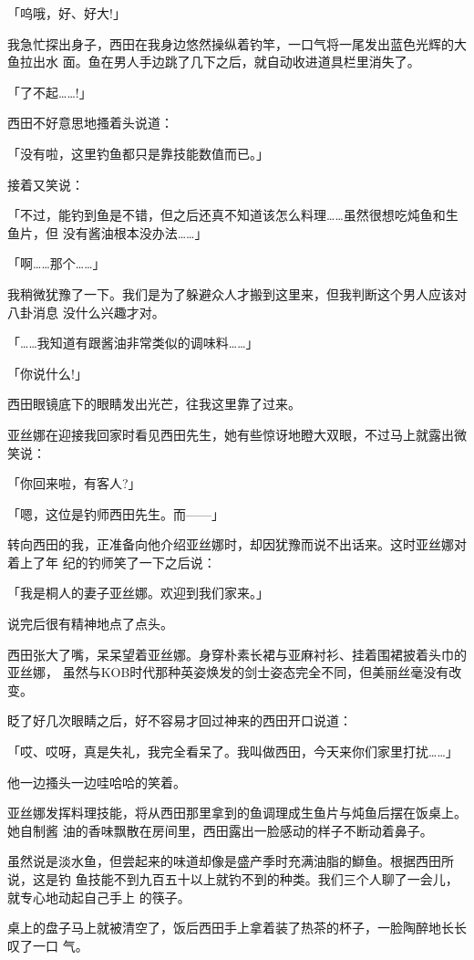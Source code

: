 \documentclass[11pt]{book}
\begin{document}
「呜哦，好、好大!」

我急忙探出身子，西田在我身边悠然操纵着钓竿，一口气将一尾发出蓝色光辉的大鱼拉出水
面。鱼在男人手边跳了几下之后，就自动收进道具栏里消失了。

「了不起……!」

西田不好意思地搔着头说道：

「没有啦，这里钓鱼都只是靠技能数值而已。」

接着又笑说：

「不过，能钓到鱼是不错，但之后还真不知道该怎么料理……虽然很想吃炖鱼和生鱼片，但
没有酱油根本没办法……」

「啊……那个……」

我稍微犹豫了一下。我们是为了躲避众人才搬到这里来，但我判断这个男人应该对八卦消息
没什么兴趣才对。

「……我知道有跟酱油非常类似的调味料……」

「你说什么!」

西田眼镜底下的眼睛发出光芒，往我这里靠了过来。

亚丝娜在迎接我回家时看见西田先生，她有些惊讶地瞪大双眼，不过马上就露出微笑说：

「你回来啦，有客人?」

「嗯，这位是钓师西田先生。而——」

转向西田的我，正准备向他介绍亚丝娜时，却因犹豫而说不出话来。这时亚丝娜对着上了年
纪的钓师笑了一下之后说：

「我是桐人的妻子亚丝娜。欢迎到我们家来。」

说完后很有精神地点了点头。

西田张大了嘴，呆呆望着亚丝娜。身穿朴素长裙与亚麻衬衫、挂着围裙披着头巾的亚丝娜，
虽然与KOB时代那种英姿焕发的剑士姿态完全不同，但美丽丝毫没有改变。

眨了好几次眼睛之后，好不容易才回过神来的西田开口说道：

「哎、哎呀，真是失礼，我完全看呆了。我叫做西田，今天来你们家里打扰……」

他一边搔头一边哇哈哈的笑着。

亚丝娜发挥料理技能，将从西田那里拿到的鱼调理成生鱼片与炖鱼后摆在饭桌上。她自制酱
油的香味飘散在房间里，西田露出一脸感动的样子不断动着鼻子。

虽然说是淡水鱼，但尝起来的味道却像是盛产季时充满油脂的鰤鱼。根据西田所说，这是钓
鱼技能不到九百五十以上就钓不到的种类。我们三个人聊了一会儿，就专心地动起自己手上
的筷子。

桌上的盘子马上就被清空了，饭后西田手上拿着装了热茶的杯子，一脸陶醉地长长叹了一口
气。
\end{document}
